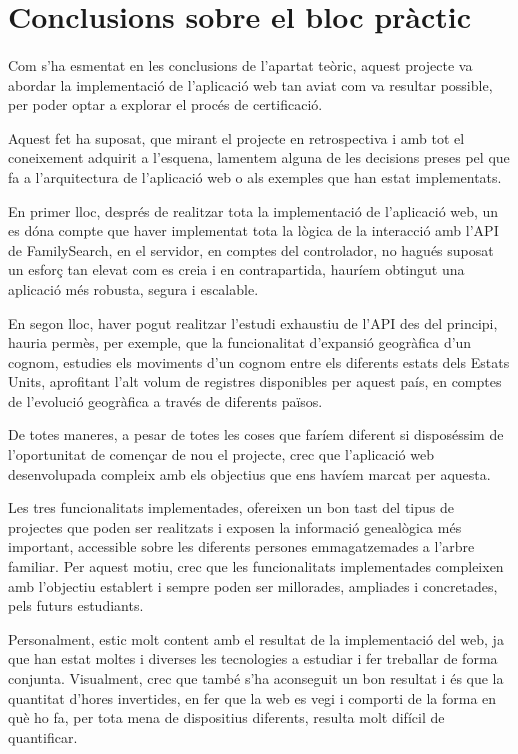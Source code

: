 \section{Conclusions sobre el bloc pràctic}

    \paragraph{}
    Com s’ha esmentat en les conclusions de l’apartat teòric, aquest projecte va abordar la implementació de l’aplicació web tan aviat com va resultar possible, per poder optar a explorar el procés de certificació.

    Aquest fet ha suposat, que mirant el projecte en retrospectiva i amb tot el coneixement adquirit a l’esquena, lamentem alguna de les decisions preses pel que fa a l’arquitectura de l’aplicació web o als exemples que han estat implementats.

    En primer lloc, després de realitzar tota la implementació de l’aplicació web, un es dóna compte que haver implementat tota la lògica de la interacció amb l’API de FamilySearch, en el servidor, en comptes del controlador, no hagués suposat un esforç tan elevat com es creia i en contrapartida, hauríem obtingut una aplicació més robusta, segura i escalable.

    En segon lloc, haver pogut realitzar l’estudi exhaustiu de l’API des del principi, hauria permès, per exemple, que la funcionalitat d’expansió geogràfica d’un cognom, estudies els moviments d’un cognom entre els diferents estats dels Estats Units, aprofitant l’alt volum de registres disponibles per aquest país, en comptes de l’evolució geogràfica a través de diferents països.

    De totes maneres, a pesar de totes les coses que faríem diferent si disposéssim de l’oportunitat de començar de nou el projecte, crec que l’aplicació web desenvolupada compleix amb els objectius que ens havíem marcat per aquesta.

    Les tres funcionalitats implementades, ofereixen un bon tast del tipus de projectes que poden ser realitzats i exposen la informació genealògica més important, accessible sobre les diferents persones emmagatzemades a l’arbre familiar. Per aquest motiu, crec que les funcionalitats implementades compleixen amb l’objectiu establert i sempre poden ser millorades, ampliades i concretades, pels futurs estudiants.

    Personalment, estic molt content amb el resultat de la implementació del web, ja que han estat moltes i diverses les tecnologies a estudiar i fer treballar de forma conjunta. Visualment, crec que també s’ha aconseguit un bon resultat i és que la quantitat d’hores invertides, en fer que la web es vegi i comporti de la forma en què ho fa, per tota mena de dispositius diferents, resulta molt difícil de quantificar.

